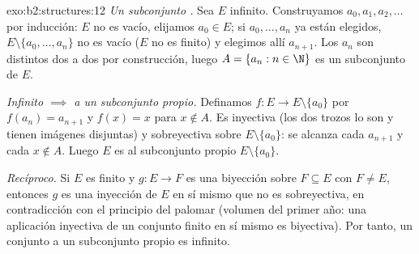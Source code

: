 \begin{solution}{exo:b2:structures:12}
\emph{Un subconjunto .} Sea $E$ infinito. Construyamos
$a_0, a_1, a_2, \dots$ por inducción: $E$ no es vacío, elijamos
$a_0 \in E$; si $a_0, \dots, a_n$ ya están elegidos, $E \setminus
\{a_0, \dots, a_n\}$ no es vacío ($E$ no es finito) y elegimos
allí $a_{n+1}$. Los $a_n$ son distintos dos a dos por
construcción, luego $A = \{a_n : n \in \N\}$ es un subconjunto
 de $E$.

\emph{Infinito $\implies$  a un subconjunto propio.}
Definamos $f \colon E \to E \setminus \{a_0\}$ por $f(a_n) =
a_{n+1}$ y $f(x) = x$ para $x \notin A$. Es inyectiva (los dos
trozos lo son y tienen imágenes disjuntas) y sobreyectiva sobre $E
\setminus \{a_0\}$: se alcanza cada $a_{n+1}$ y cada $x \notin A$.
Luego $E$ es  al subconjunto propio $E \setminus
\{a_0\}$.

\emph{Recíproco.} Si $E$ es finito y $g \colon E \to F$ es una
biyección sobre $F \subseteq E$ con $F \neq E$, entonces $g$ es una
inyección de $E$ en sí mismo que no es sobreyectiva, en
contradicción con el principio del palomar (volumen del primer
año: una aplicación inyectiva de un conjunto finito en sí mismo es
biyectiva). Por tanto, un conjunto  a un subconjunto
propio es infinito.
\end{solution}

